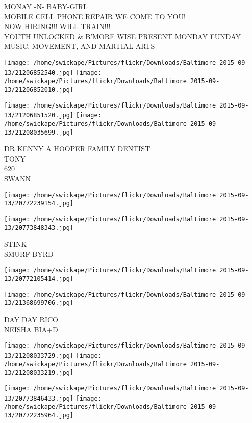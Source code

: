 \documentclass[10pt,letterpaper]{article}
\begin{document}
MONAY {-}N{-} BABY{-}GIRL\\
MOBILE CELL PHONE REPAIR WE COME TO YOU!\\
NOW HIRING!!! WILL TRAIN!!!\\
YOUTH UNLOCKED \& B'MORE WISE PRESENT MONDAY FUNDAY MUSIC, MOVEMENT, AND MARTIAL ARTS\\
\pagebreak

\texttt{[image: /home/swickape/Pictures/flickr/Downloads/Baltimore 2015-09-13/21206852540.jpg]}
\texttt{[image: /home/swickape/Pictures/flickr/Downloads/Baltimore 2015-09-13/21206852010.jpg]}

\texttt{[image: /home/swickape/Pictures/flickr/Downloads/Baltimore 2015-09-13/21206851520.jpg]}
\texttt{[image: /home/swickape/Pictures/flickr/Downloads/Baltimore 2015-09-13/21208035699.jpg]}

DR KENNY A HOOPER FAMILY DENTIST\\
TONY\\
620\\
SWANN\\
\pagebreak

\texttt{[image: /home/swickape/Pictures/flickr/Downloads/Baltimore 2015-09-13/20772239154.jpg]}

\vspace{0.25in}
\texttt{[image: /home/swickape/Pictures/flickr/Downloads/Baltimore 2015-09-13/20773848343.jpg]}

STINK\\
SMURF BYRD\\
\pagebreak

\texttt{[image: /home/swickape/Pictures/flickr/Downloads/Baltimore 2015-09-13/20772105414.jpg]}

\vspace{0.25in}
\texttt{[image: /home/swickape/Pictures/flickr/Downloads/Baltimore 2015-09-13/21368699706.jpg]}

DAY DAY RICO\\
NEISHA BIA+D\\
\pagebreak

\texttt{[image: /home/swickape/Pictures/flickr/Downloads/Baltimore 2015-09-13/21208033729.jpg]}
\texttt{[image: /home/swickape/Pictures/flickr/Downloads/Baltimore 2015-09-13/21208033219.jpg]}

\texttt{[image: /home/swickape/Pictures/flickr/Downloads/Baltimore 2015-09-13/20773846433.jpg]}
\texttt{[image: /home/swickape/Pictures/flickr/Downloads/Baltimore 2015-09-13/20772235964.jpg]}
\end{document}
